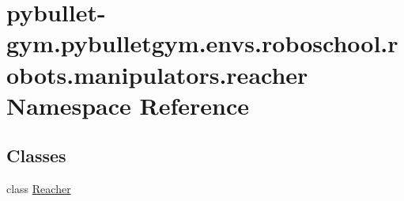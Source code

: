 \hypertarget{namespacepybullet-gym_1_1pybulletgym_1_1envs_1_1roboschool_1_1robots_1_1manipulators_1_1reacher}{}\section{pybullet-\/gym.pybulletgym.\+envs.\+roboschool.\+robots.\+manipulators.\+reacher Namespace Reference}
\label{namespacepybullet-gym_1_1pybulletgym_1_1envs_1_1roboschool_1_1robots_1_1manipulators_1_1reacher}
\subsection*{Classes}
\begin{DoxyCompactItemize}
\item 
class \hyperlink{classpybullet-gym_1_1pybulletgym_1_1envs_1_1roboschool_1_1robots_1_1manipulators_1_1reacher_1_1_reacher}{Reacher}
\end{DoxyCompactItemize}
